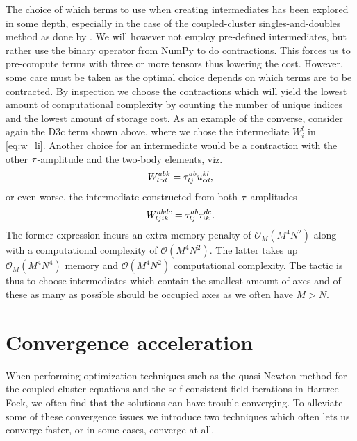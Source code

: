             The choice of which terms to use when creating intermediates has
            been explored in some depth, especially in the case of the
            coupled-cluster singles-and-doubles method as done by
            \citeauthor{gauss1995coupled} \cite{gauss1995coupled}.
            We will however not employ pre-defined intermediates, but rather use
            the binary operator  from NumPy to do
            contractions.
            This forces us to pre-compute terms with three or more tensors thus
            lowering the cost.
            However, some care must be taken as the optimal choice depends on
            which terms are to be contracted.
            By inspection we choose the contractions which will yield the lowest
            amount of computational complexity by counting the number of unique
            indices and the lowest amount of storage cost.
            As an example of the converse, consider again the D3c term shown above,
            where we chose the intermediate $W^{l}_{i}$ in \autoref{eq:w_li}.
            Another choice for an intermediate would be a contraction with the
            other $\tau$-amplitude and the two-body elements, viz.
            \begin{align}
                W^{abk}_{lcd} = \tau^{ab}_{lj} u^{kl}_{cd},
            \end{align}
            or even worse, the intermediate constructed from both
            $\tau$-amplitudes
            \begin{align}
                W^{abdc}_{ljik} = \tau^{ab}_{lj} \tau^{dc}_{ik}.
            \end{align}
            The former expression incurs an extra memory penalty of
            $\mathcal{O}_M(M^4 N^2)$ along with a computational complexity of
            $\mathcal{O}(M^4 N^2)$.
            The latter takes up $\mathcal{O}_M(M^4 N^4)$ memory and
            $\mathcal{O}(M^4 N^2)$ computational complexity.
            The tactic is thus to choose intermediates which contain the
            smallest amount of axes and of these as many as possible should be
            occupied axes as we often have $M > N$.


    \section{Convergence acceleration}
        \label{sec:convergence}
        When performing optimization techniques such as the quasi-Newton method
        for the coupled-cluster equations and the self-consistent field
        iterations in Hartree-Fock, we often find that the solutions can have
        trouble converging.
        To alleviate some of these convergence issues we introduce two
        techniques which often lets us converge faster, or in some cases,
        converge at all.

